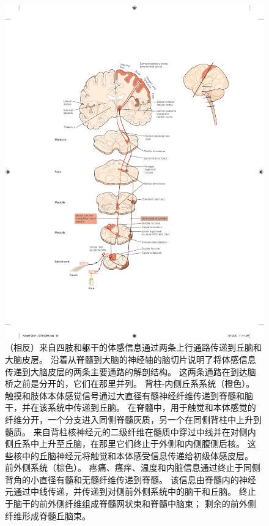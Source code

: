 \begin{figure}[htbp]
	\centering
	\includegraphics[width=1.0\linewidth]{chap04/fig_4_6}
	\caption{（相反）来自四肢和躯干的体感信息通过两条上行通路传递到丘脑和大脑皮层。 
		沿着从脊髓到大脑的神经轴的脑切片说明了将体感信息传递到大脑皮层的两条主要通路的解剖结构。 
		这两条通路在到达脑桥之前是分开的，它们在那里并列。 背柱-内侧丘系系统（橙色）。 
		触摸和肢体本体感觉信号通过大直径有髓神经纤维传递到脊髓和脑干，并在该系统中传递到丘脑。 
		在脊髓中，用于触觉和本体感觉的纤维分开，一个分支进入同侧脊髓灰质，另一个在同侧背柱中上升到髓质。 
		来自背柱核神经元的二级纤维在髓质中穿过中线并在对侧内侧丘系中上升至丘脑，在那里它们终止于外侧和内侧腹侧后核。 
		这些核中的丘脑神经元将触觉和本体感受信息传递给初级体感皮层。 
		前外侧系统（棕色）。 
		疼痛、瘙痒、温度和内脏信息通过终止于同侧背角的小直径有髓和无髓纤维传递到脊髓。 
		该信息由脊髓内的神经元通过中线传递，并传递到对侧前外侧系统中的脑干和丘脑。 
		终止于脑干的前外侧纤维组成脊髓网状束和脊髓中脑束； 剩余的前外侧纤维形成脊髓丘脑束。}
	\label{fig:4_6}
\end{figure}


